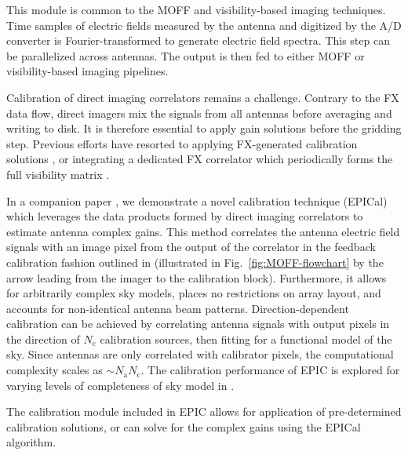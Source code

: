 \documentclass[a4paper,fleqn,usenatbib]{mnras}
\begin{document}
\par\medskip
{}
\par\medskip
\noindent This module is common to the MOFF and visibility-based imaging techniques. Time samples of electric fields measured by the antenna and digitized by the A/D converter is Fourier-transformed to generate electric field spectra. This step can be parallelized across antennas. The output is then fed to either MOFF or visibility-based imaging pipelines.

\par\medskip
{}
\par\medskip
\noindent Calibration of direct imaging correlators remains a challenge. Contrary to the FX data flow, direct imagers mix the signals from all antennas before averaging and writing to disk. It is therefore essential to apply gain solutions before the gridding step. Previous efforts have resorted to applying FX-generated calibration solutions \citep{zhe14,fos14}, or integrating a dedicated FX correlator which periodically forms the full visibility matrix \citep{wij09,dev09}. 

In a companion paper \citep{bea16}, we demonstrate a novel calibration technique (EPICal) which leverages the data products formed by direct imaging correlators to estimate antenna complex gains. This method correlates the antenna electric field signals with an image pixel from the output of the correlator in the feedback calibration fashion outlined in \citealt{mor11} (illustrated in Fig.~\ref{fig:MOFF-flowchart} by the arrow leading from the imager to the calibration block). Furthermore, it allows for arbitrarily complex sky models, places no restrictions on array layout, and accounts for non-identical antenna beam patterns. Direction-dependent calibration can be achieved by correlating antenna signals with output pixels in the direction of $N_\textrm{c}$ calibration sources, then fitting for a functional model of the sky. Since antennas are only correlated with calibrator pixels, the computational complexity scales as $\sim N_\textrm{a} N_\textrm{c}$. The calibration performance of EPIC is explored for varying levels of completeness of sky model in \citet{bea16}.

The calibration module included in EPIC allows for application of pre-determined calibration solutions, or can solve for the complex gains using the EPICal algorithm.
\end{document}
